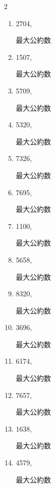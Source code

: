 \begin{multicols}{2}
\begin{enumerate}
        最大公約数

  \item 2704,

        最大公約数

  \item 1507,

        最大公約数

\columnbreak %

  \item 5709,

        最大公約数

  \item 5320,

        最大公約数

  \item 7326,

        最大公約数

  \item 7695,

        最大公約数

  \item 1100,

        最大公約数

\columnbreak %

\resetques

  \item 5658,

        最大公約数

  \item 8320,

        最大公約数

  \item 3696,

        最大公約数

  \item 6174,

        最大公約数

  \item 7657,

        最大公約数

\columnbreak %

  \item 1638,

        最大公約数

  \item 4579,

        最大公約数


\end{enumerate}
\end{multicols}

